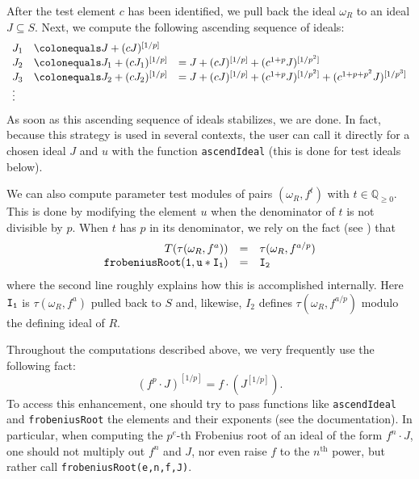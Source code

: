 \documentclass{amsart}
\renewcommand{\geq}{\geqslant}
\begin{document}
After the test element $c$ has been identified, we pull back the ideal $\omega_R$ to an ideal $J \subseteq S$.  Next, we compute the following ascending sequence of ideals:
\begin{equation}
\label{eq.AscendIdealExplanation}
\begin{array}{lll}
J_1 &\colonequals   J + (c J)^{[1/p]} & \\
J_2 &\colonequals   J_1 + (c J_1)^{[1/p]} & = J + (c J)^{[1/p]} + (c^{1+p} J)^{[1/p^2]} \\
J_3 &\colonequals    J_2 + (cJ_2)^{[1/p]} & = J + (c J)^{[1/p]} + (c^{1+p} J)^{[1/p^2]} + (c^{1+p+p^2} J)^{[1/p^3]} \\
\vdots
\end{array}
\end{equation}
As soon as this ascending sequence of ideals stabilizes, we are done.
In fact, because this strategy is used in several contexts, the user can call it directly for a chosen ideal $J$ and $u$ with the function \texttt{ascendIdeal} (this is done for test ideals below).

We can also compute parameter test modules of pairs $(\omega_R, f^{t})$ with $t \in \mathbb{Q}_{\geq 0}$.
This is done by modifying the element $u$ when the denominator of $t$ is not divisible by $p$.
When $t$ has $p$ in its denominator, we rely on the fact (see \cite{BlickleMustataSmithDiscretenessAndRationalityOfFThresholds,SchwedeTuckerTestIdealFiniteMaps}) that
\[
\begin{array}{rcl}
T(\tau(\omega_R, f^a)) & = & \tau(\omega_R, f^{a/p})\\
{\tt frobeniusRoot(1, u*I_1)} & {\tt =} & {\tt I_2}
\end{array}
\]
where the second line roughly explains how this is accomplished internally.
Here ${\tt I_1}$ is $\tau(\omega_R, f^a)$ pulled back to $S$ and, likewise, $I_2$ defines $\tau(\omega_R, f^{a/p})$ modulo the defining ideal of $R$.

\begin{remark}
Throughout the computations described above, we very frequently use the following fact:
\[
(f^p \cdot J)^{[1/p]} = f \cdot (J^{[1/p]}).
\]
To access this enhancement, one should try to pass functions like \texttt{ascendIdeal} and \texttt{frobeniusRoot} the elements and their exponents (see the documentation).
In particular, when computing the $p^e$-th Frobenius root of an ideal of the form $f^n \cdot J$, one should not multiply out $f^n$ and $J$, nor even raise $f$ to the $n^\mathrm{th}$ power, but rather call \texttt{frobeniusRoot(e,n,f,J)}.
\end{remark}
\end{document}
